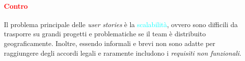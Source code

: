 \paragraph{\textcolor{red}{Contro}} Il problema principale delle \emph{user stories} è la \textcolor{cyan}{scalabilità}, 
ovvero sono difficili da trasporre su grandi progetti e problematiche se il team è distribuito geograficamente. Inoltre, essendo
informali e brevi non sono adatte per raggiungere degli accordi legali e raramente includono i \emph{requisiti non funzionali}.